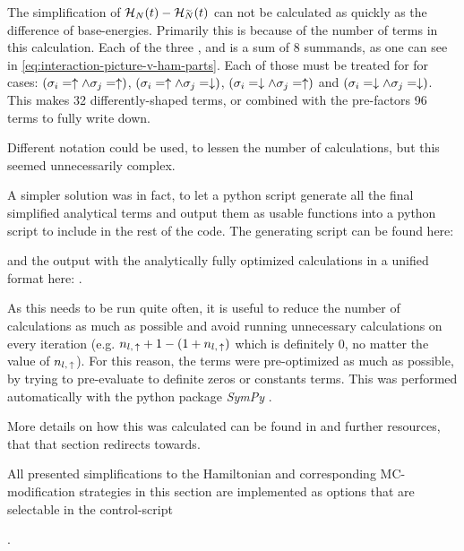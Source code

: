 The simplification of $\HNOft - \HNOft[\vphantom{N}\smash{\tilde{N}}]$ can not be calculated as quickly as the difference of base-energies.
Primarily this is because of the number of terms in this calculation. Each of the three ,  and  is a sum of 8 summands, as one can see in \autoref{eq:interaction-picture-v-ham-parts}.
Each of those must be treated for for cases: $(\sigma_i = \uparrow \land \sigma_j = \uparrow)$, $(\sigma_i = \uparrow \land \sigma_j = \downarrow)$, $(\sigma_i = \downarrow \land \sigma_j = \uparrow)$ and $(\sigma_i = \downarrow \land \sigma_j = \downarrow)$.
This makes 32 differently-shaped terms, or combined with the pre-factors 96 terms to fully write down.

Different notation could be used, to lessen the number of calculations, but this seemed unnecessarily complex.

A simpler solution was in fact, to let a python script generate all the final simplified analytical terms and output them as usable functions into a python script to include in the rest of the code.
The generating script can be found here: 


and the output with the analytically fully optimized calculations in a unified format here:
.

As this needs to be run quite often, it is useful to reduce the number of calculations as much as possible and avoid running unnecessary calculations on every iteration (e.g. $n_{l,\,\uparrow} + 1 - (1 + n_{l,\,\uparrow})$ which is definitely 0, no matter the value of $n_{l,\,\uparrow}$).
For this reason, the terms were pre-optimized as much as possible, by trying to pre-evaluate to definite zeros or constants terms. 
This was performed automatically with the python package \emph{SymPy} \cite{sympyPackage}.

More details on how this was calculated can be found in  and further resources, that that section redirects towards.

\vspace{1cm}
All presented simplifications to the Hamiltonian and corresponding MC-modification strategies in this section are implemented as options that are selectable in the control-script   

.
 